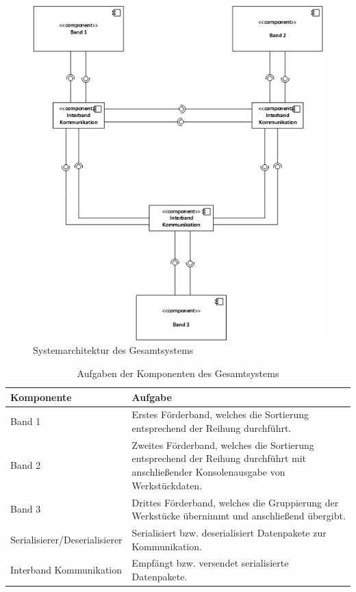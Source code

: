 \documentclass[a4paper, 11pt]{article}
\begin{document}
\begin{figure}[H]
\centering 
    \includegraphics[scale=0.60]{images/SW_Architektur/Gesamtsystem.jpg}
    \caption{Systemarchitektur des Gesamtsystems}
    \label{archtotal}
\end{figure}

\begin{table}[H]
\center
    \begin{tabularx}{\textwidth}{|l|X|}
        \hline
        \textbf{Komponente}&\textbf{Aufgabe}\\
        \hline
        Band 1&Erstes Förderband, welches die Sortierung entsprechend der Reihung durchführt.\\
        \hline
        Band 2&Zweites Förderband, welches die Sortierung entsprechend der Reihung durchführt mit anschließender Konsolenausgabe von Werkstückdaten.\\
        \hline
        Band 3&Drittes Förderband, welches die Gruppierung der Werkstücke übernimmt und anschließend übergibt.\\
        \hline
        Serialisierer/Deserialisierer&Serialisiert bzw. deserialisiert Datenpakete zur Kommunikation.\\
        \hline
        Interband Kommunikation&Empfängt bzw. versendet serialisierte Datenpakete.\\
        \hline
        \end{tabularx}
    \caption{Aufgaben der Komponenten des Gesamtsystems}
    \label{archtotalcomp}
\end{table}
\end{document}
